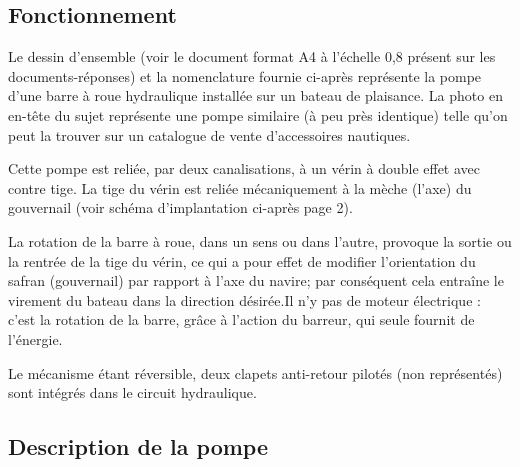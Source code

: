 \pagestyle{fancy}
\thispagestyle{plain}

\vspace{4.5cm}

\def\columnseprulecolor{\color{ocre}}
\setlength{\columnseprule}{0.4pt} 

\setcounter{exo}{0}

\ifprof
\begin{multicols}{2}
\else
\begin{multicols}{2}
\fi


\subsection*{Fonctionnement}

Le dessin d'ensemble (voir le document format A4 à l’échelle 0,8 présent sur les documents-réponses) et la nomenclature fournie ci-après représente la pompe d'une barre à roue hydraulique installée sur un bateau de plaisance. La photo en en-tête du sujet représente une pompe similaire (à peu près identique) telle qu'on peut la trouver sur un catalogue de vente d'accessoires nautiques.


Cette pompe est reliée, par deux canalisations, à un vérin à double effet avec contre tige. La tige du vérin est reliée mécaniquement à la mèche (l’axe) du gouvernail (voir schéma d'implantation ci-après page 2).

La rotation de la barre à roue, dans un sens ou dans l'autre, provoque la sortie ou la rentrée de la tige du vérin, ce qui a pour effet de modifier l'orientation du safran (gouvernail) par rapport à l'axe du navire; par conséquent cela entraîne le virement du bateau dans la direction désirée.Il n’y pas de moteur électrique : c’est la rotation de la barre, grâce à l’action du barreur, qui seule fournit de l’énergie.

Le mécanisme étant réversible, deux clapets anti-retour pilotés (non représentés) sont intégrés dans le circuit hydraulique.


\subsection*{Description de la pompe}


\end{multicols}
\end{multicols}
